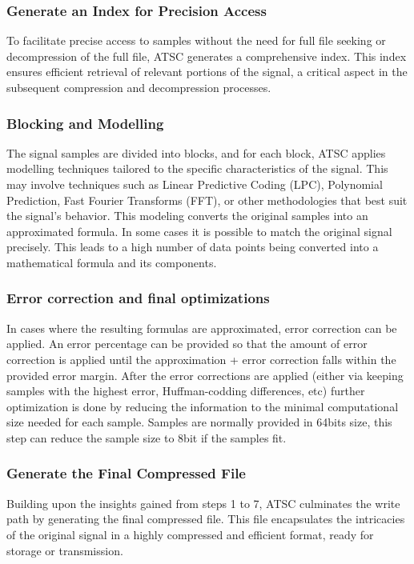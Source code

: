\documentclass[conference]{IEEEtran}
\begin{document}
\vspace{10pt}
\subsubsection{Generate an Index for Precision Access}
To facilitate precise access to samples without the need for full file seeking or decompression of the full file, ATSC generates a comprehensive index. This index ensures efficient retrieval of relevant portions of the signal, a critical aspect in the subsequent compression and decompression processes.

\vspace{10pt}
\subsubsection{Blocking and Modelling}
The signal samples are divided into blocks, and for each block, ATSC applies modelling techniques tailored to the specific characteristics of the signal. This may involve techniques such as Linear Predictive Coding (LPC), Polynomial Prediction, Fast Fourier Transforms (FFT), or other methodologies that best suit the signal's behavior. This modeling converts the original samples into an approximated formula. In some cases it is possible to match the original signal precisely. This leads to a high number of data points being converted into a mathematical formula and its components.

\vspace{10pt}
\subsubsection{Error correction and final optimizations}
In cases where the resulting formulas are approximated, error correction can be applied. An error percentage can be provided so that the amount of error correction is applied until the approximation + error correction falls within the provided error margin. After the error corrections are applied (either via keeping samples with the highest error, Huffman-codding differences, etc) further optimization is done by reducing the information to the minimal computational size needed for each sample. Samples are normally provided in 64bits size, this step can reduce the sample size to 8bit if the samples fit.

\vspace{10pt}
\subsubsection{Generate the Final Compressed File}
Building upon the insights gained from steps 1 to 7, ATSC culminates the write path by generating the final compressed file. This file encapsulates the intricacies of the original signal in a highly compressed and efficient format, ready for storage or transmission.
\end{document}
